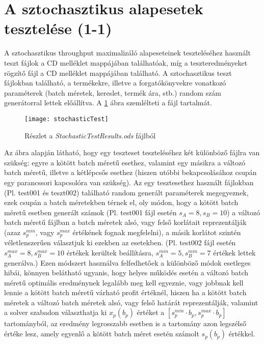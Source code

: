 \section{A sztochasztikus alapesetek tesztelése (1-1)}
A sztochasztikus throughput maximalizáló alapeseteinek teszteléséhez használt teszt fájlok a CD melléklet   mappájában találhatóak, míg a teszteredményeket rögzítő  fájl a CD melléklet  mappájában található.
A sztochasztikus teszt fájlokban található, a termékekre, illetve a forgatókönyvekre vonatkozó paraméterek (batch méretek, kereslet, termék ára, stb.) random szám generátorral lettek előállítva.
A \ref{stochastic_test} ábra szemlélteti a  fájl tartalmát.
\begin{figure}[H]
\begin{center}
\texttt{[image: stochasticTest]}
\caption{Részlet a \textit{StochasticTestResults.ods} fájlból}
\label{stochastic_test}
\end{center}
\end{figure}
 Az ábra alapján látható, hogy egy teszteset teszteléséhez két különböző fájlra van szükség: egyre a kötött batch méretű esethez, valamint egy másikra a változó batch méretű, illetve a kétlépcsős esethez (hiszen utóbbi bekapcsolásához csupán egy parancssori kapcsolóra van szükség).
Az egy tesztesethez használt fájlokban (Pl. test001 és teszt002) található random generált paraméterek megegyeznek, ezek csupán a batch méretekben térnek el, oly módon, hogy a kötött batch méretű esetben generált számok (Pl. test001 fájl esetén $s_A=8, s_B=10$) a változó batch méretű fájlban a batch méretek alsó, vagy felső korlátait reprezentálják (azaz $s_p^{min}$, vagy $s_p^{max}$ értékének fognak megfelelni), a másik korlátot szintén véletlenszerűen választjuk ki ezekben az esetekben. (Pl. test002 fájl esetén $s_A^{max}=8, s_B^{max}=10$ értékek kerültek beállításra, $s_A^{min}=5, s_B^{min}=7$ értékek lettek generálva.)
Ezen módszert használva felfedhetőek a különböző módok esetleges hibái, könnyen belátható ugyanis, hogy helyes működés esetén a változó batch méretű optimális eredménynek legalább meg kell egyeznie, vagy jobbnak kell lennie a kötött batch méretű várható profit értéknél, hiszen ha a kötött batch méretek a változó batch méretek alsó, vagy felső határát reprezentálják, valamint a solver szabadon választhatja ki $x_p(b_p)$ értéket a $[s_p^{min}\cdot b_p,s_p^{max}\cdot b_p]$ tartományból, az eredmény legrosszabb esetben is a tartomány azon legszélső értéke lesz, amely egyenlő a kötött batch méret esetén számolt $s_p(b_p)$ értékkel.
